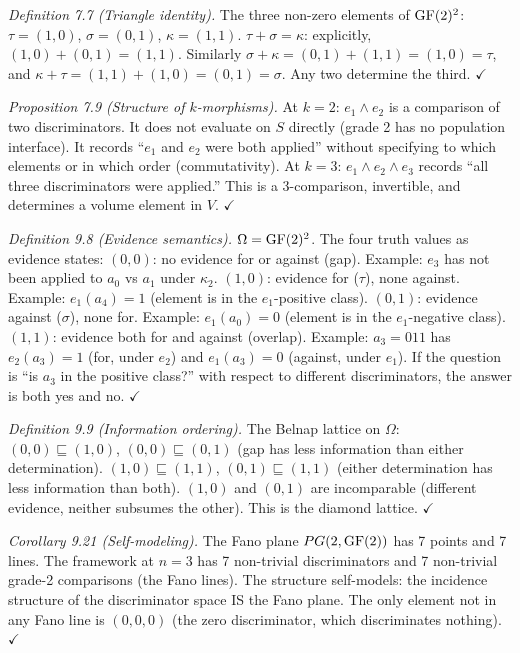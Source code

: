 \emph{Definition 7.7 (Triangle identity).}
The three non-zero elements of $\operatorname{GF}(2)^2$:
$\tau = (1,0)$, $\sigma = (0,1)$, $\kappa = (1,1)$.
$\tau + \sigma = \kappa$: explicitly,
$(1,0) + (0,1) = (1,1)$. Similarly $\sigma + \kappa =
(0,1) + (1,1) = (1,0) = \tau$, and $\kappa + \tau =
(1,1) + (1,0) = (0,1) = \sigma$. Any two determine the
third. $\checkmark$

\emph{Proposition 7.9 (Structure of $k$-morphisms).}
At $k = 2$: $e_1 \wedge e_2$ is a comparison of two
discriminators. It does not evaluate on $S$ directly
(grade 2 has no population interface). It records
``$e_1$ and $e_2$ were both applied'' without specifying
to which elements or in which order (commutativity).
At $k = 3$: $e_1 \wedge e_2 \wedge e_3$ records
``all three discriminators were applied.'' This is a
3-comparison, invertible, and determines a volume element
in $V$. $\checkmark$

\emph{Definition 9.8 (Evidence semantics).}
$\Omega = \operatorname{GF}(2)^2$. The four truth values as evidence
states:
$(0,0)$: no evidence for or against (gap). Example:
$e_3$ has not been applied to $a_0$ vs $a_1$ under
$\kappa_2$.
$(1,0)$: evidence for ($\tau$), none against. Example:
$e_1(a_4) = 1$ (element is in the $e_1$-positive class).
$(0,1)$: evidence against ($\sigma$), none for.
Example: $e_1(a_0) = 0$ (element is in the
$e_1$-negative class).
$(1,1)$: evidence both for and against (overlap).
Example: $a_3 = 011$ has $e_2(a_3) = 1$ (for, under
$e_2$) and $e_1(a_3) = 0$ (against, under $e_1$).
If the question is ``is $a_3$ in the positive class?''
with respect to different discriminators, the answer is
both yes and no. $\checkmark$

\emph{Definition 9.9 (Information ordering).}
The Belnap lattice on $\Omega$:
$(0,0) \sqsubseteq (1,0)$, $(0,0) \sqsubseteq (0,1)$
(gap has less information than either determination).
$(1,0) \sqsubseteq (1,1)$, $(0,1) \sqsubseteq (1,1)$
(either determination has less information than both).
$(1,0)$ and $(0,1)$ are incomparable (different
evidence, neither subsumes the other). This is the
diamond lattice. $\checkmark$

\emph{Corollary 9.21 (Self-modeling).}
The Fano plane $PG(2, \operatorname{GF}(2))$ has 7 points and 7
lines. The framework at $n = 3$ has 7 non-trivial
discriminators and 7 non-trivial grade-2 comparisons
(the Fano lines). The structure self-models: the
incidence structure of the discriminator space IS the
Fano plane. The only element not in any Fano line
is $(0,0,0)$ (the zero discriminator, which
discriminates nothing). $\checkmark$

